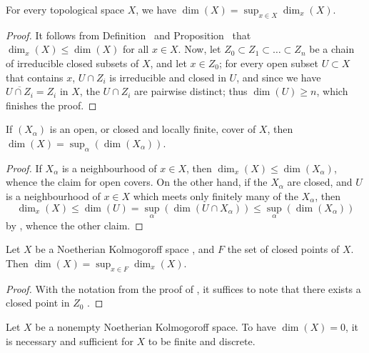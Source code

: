 \begin{prop}[14.1.6]
\label{0.14.1.6}
For every topological space $X$, we have $\dim(X)=\sup_{x\in X}\dim_x(X)$.
\end{prop}

\begin{proof}
\label{proof-0.14.1.6}
It follows from Definition~ and Proposition~ that $\dim_x(X)\leq\dim(X)$ for all $x\in X$.
Now, let $Z_0\subset Z_1\subset\ldots\subset Z_n$ be a chain of irreducible closed subsets of $X$, and let $x\in Z_0$;
for every open subset $U\subset X$ that contains $x$, $U\cap Z_i$ is irreducible  and closed in $U$, and since we have $\overline{U\cap Z_i}=Z_i$ in $X$, the $U\cap Z_i$ are pairwise distinct;
thus $\dim(U)\geq n$, which finishes the proof.
\end{proof}

\begin{cor}[14.1.7]
\label{0.14.1.7}
If $(X_\alpha)$ is an open, or closed and locally finite, cover of $X$, then $\dim(X)=\sup_\alpha(\dim(X_\alpha))$.
\end{cor}

\begin{proof}
\label{proof-0.14.1.7}
If $X_\alpha$ is a neighbourhood of $x\in X$, then $\dim_x(X)\leq\dim(X_\alpha)$, whence the claim for open covers.
On the other hand, if the $X_\alpha$ are closed, and $U$ is a neighbourhood of $x\in X$ which meets only finitely many of the $X_\alpha$, then
\[
  \dim_x(X)\leq\dim(U)=\sup_\alpha(\dim(U\cap X_\alpha))\leq\sup_\alpha(\dim(X_\alpha))
\]
by , whence the other claim.
\end{proof}

\begin{cor}[14.1.8]
\label{0.14.1.8}
Let $X$ be a Noetherian Kolmogoroff space , and $F$ the set of closed points of $X$.
Then $\dim(X)=\sup_{x\in F}\dim_x(X)$.
\end{cor}

\begin{proof}
\label{proof-0.14.1.8}
With the notation from the proof of , it suffices to note that there exists a closed point in $Z_0$ .
\end{proof}

\begin{prop}[14.1.9]
\label{0.14.1.9}
Let $X$ be a nonempty Noetherian Kolmogoroff space.
To have $\dim(X)=0$, it is necessary and sufficient for $X$ to be finite and discrete.
\end{prop}

